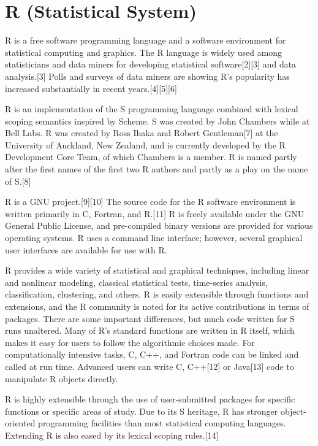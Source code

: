 \newpage
\section{R (Statistical System)}

R is a free software programming language and a software environment for statistical computing and graphics. The R language is widely used among statisticians and data miners for developing statistical software[2][3] and data analysis.[3] Polls and surveys of data miners are showing R's popularity has increased substantially in recent years.[4][5][6]

\vpara
R is an implementation of the S programming language combined with lexical scoping semantics inspired by Scheme. S was created by John Chambers while at Bell Labs. R was created by Ross Ihaka and Robert Gentleman[7] at the University of Auckland, New Zealand, and is currently developed by the R Development Core Team, of which Chambers is a member. R is named partly after the first names of the first two R authors and partly as a play on the name of S.[8]

\vpara
R is a GNU project.[9][10] The source code for the R software environment is written primarily in C, Fortran, and R.[11] R is freely available under the GNU General Public License, and pre-compiled binary versions are provided for various operating systems. R uses a command line interface; however, several graphical user interfaces are available for use with R.

\vpara
R provides a wide variety of statistical and graphical techniques, including linear and nonlinear modeling, classical statistical tests, time-series analysis, classification, clustering, and others. R is easily extensible through functions and extensions, and the R community is noted for its active contributions in terms of packages. There are some important differences, but much code written for S runs unaltered. Many of R's standard functions are written in R itself, which makes it easy for users to follow the algorithmic choices made. For computationally intensive tasks, C, C++, and Fortran code can be linked and called at run time. Advanced users can write C, C++[12] or Java[13] code to manipulate R objects directly.

\vpara
R is highly extensible through the use of user-submitted packages for specific functions or specific areas of study. Due to its S heritage, R has stronger object-oriented programming facilities than most statistical computing languages. Extending R is also eased by its lexical scoping rules.[14]

